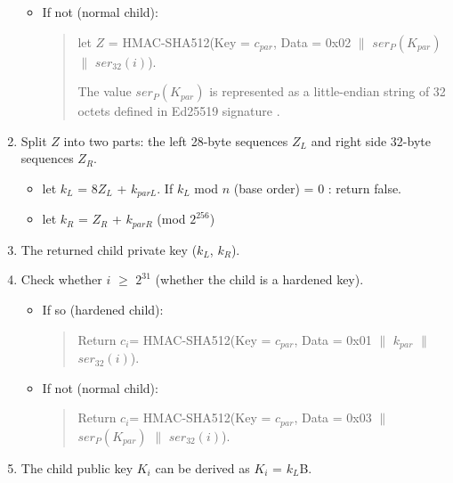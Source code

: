 \begin{adjustwidth}{0.5cm}{}
\begin{enumerate}
\begin{itemize}
\begin{quote}
                        \end{quote}

                  \item If not (normal child):
                        \begin{quote}
                            let $Z$ = HMAC-SHA512(Key = $c_{par}$, Data = 0x02 $\parallel$ $ser_{P}(K_{par})$ $\parallel$ $ser_{32}(i)$).

                            The value $ser_P(K_{par})$ is represented as a little-endian string of 32 octets defined in Ed25519 signature \cite{DBLP:journals/rfc/rfc8032}.

                        \end{quote}
              \end{itemize}
              \bigskip

        \item Split $Z$ into two parts: the left 28-byte sequences $Z_L$ and right side 32-byte sequences $Z_R$.
              \begin{itemize}
                  \item let $k_L$ = 8$Z_L$ +  $k_{parL}$. If $k_L$ mod $n$ (base order) = 0 : return false.

                  \item let  $k_R$ = $Z_R$ +  $k_{parR}$ (mod $2^{256}$)

              \end{itemize}
              \bigskip

        \item The returned child private key ($k_L$, $k_R$).

              \bigskip
        \item Check whether $i$ $\geq$ $2^{31}$ (whether the child is a hardened key).
              \begin{itemize}
                  \item If so (hardened child):
                        \begin{quote}
                            Return  $c_i$= HMAC-SHA512(Key = $c_{par}$, Data = 0x01 $\parallel$ $k_{par}$ $\parallel$ $ser_{32}(i)$).
                        \end{quote}
                  \item If not (normal child):
                        \begin{quote}
                            Return  $c_i$= HMAC-SHA512(Key = $c_{par}$, Data = 0x03 $\parallel$ $ser_P(K_{par})$ $\parallel$ $ser_{32}(i)$).
                        \end{quote}
              \end{itemize}
              \bigskip
        \item The child public key $K_i$ can be derived as $K_i$ = $k_L$B.


\end{enumerate}
\end{adjustwidth}

